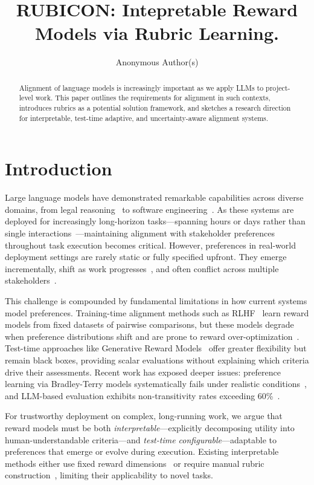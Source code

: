 \documentclass[sigconf]{acmart}
\title{RUBICON: Intepretable Reward Models via Rubric Learning.}
\author{Anonymous Author(s)}
\affiliation{
  \institution{Institution Name}
  \city{City}
  \country{Country}
}
\begin{document}
\begin{abstract}
Alignment of language models is increasingly important as we apply LLMs to project-level work. This paper outlines the requirements for alignment in such contexts, introduces rubrics as a potential solution framework, and sketches a research direction for interpretable, test-time adaptive, and uncertainty-aware alignment systems.
\end{abstract}

\maketitle

\section{Introduction}

Large language models have demonstrated remarkable capabilities across diverse domains, from legal reasoning~\cite{legalbench2023} to software engineering~\cite{swebench2024}. As these systems are deployed for increasingly long-horizon tasks—spanning hours or days rather than single interactions~\cite{metr2025longtasks}—maintaining alignment with stakeholder preferences throughout task execution becomes critical. However, preferences in real-world deployment settings are rarely static or fully specified upfront. They emerge incrementally, shift as work progresses~\cite{preference_drift2024}, and often conflict across multiple stakeholders~\cite{magym2025}.

This challenge is compounded by fundamental limitations in how current systems model preferences. Training-time alignment methods such as RLHF~\cite{instructgpt2022} learn reward models from fixed datasets of pairwise comparisons, but these models degrade when preference distributions shift and are prone to reward over-optimization~\cite{goodhart2022}. Test-time approaches like Generative Reward Models~\cite{genrm2024} offer greater flexibility but remain black boxes, providing scalar evaluations without explaining which criteria drive their assessments. Recent work has exposed deeper issues: preference learning via Bradley-Terry models systematically fails under realistic conditions~\cite{bt_critique2024}, and LLM-based evaluation exhibits non-transitivity rates exceeding 60\%~\cite{elspr2025,nontransitivity2025}.

For trustworthy deployment on complex, long-running work, we argue that reward models must be both \emph{interpretable}—explicitly decomposing utility into human-understandable criteria—and \emph{test-time configurable}—adaptable to preferences that emerge or evolve during execution. Existing interpretable methods either use fixed reward dimensions~\cite{armorm2024} or require manual rubric construction~\cite{rubric_rl2025}, limiting their applicability to novel tasks.
\end{document}
